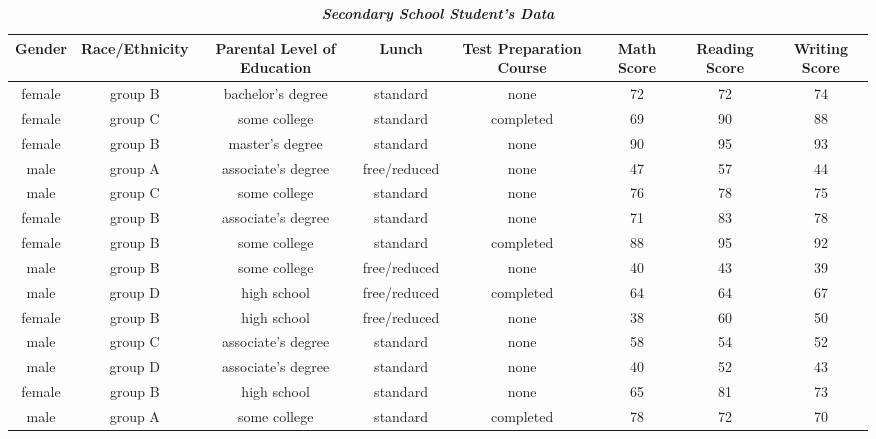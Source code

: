 \documentclass{article}
\begin{document}
 	\begin{table}[h!]
 		\begin{center}
 			\caption{\textbf{\textit{Secondary School Student's Data}}}
 			\label{tab:table1}
 			\begin{small}
 			\begin{tabular}{|c|c|c|c|c|c|c|c|}
 				\hline
 			\textbf{Gender} & \textbf{Race/Ethnicity} & \textbf{Parental Level of Education} & \textbf{Lunch} & \textbf{Test Preparation Course} & \textbf{Math Score} & \textbf{Reading Score} & \textbf{Writing Score}\\
 				\hline
 				female & group B & bachelor's degree & standard & none & 72 & 72 & 74\\
 				\hline
 				female & group C & some college & standard & completed & 69 & 90 & 88\\
 				\hline
 				female & group B & master's degree & standard & none & 90 & 95 & 93\\
 				\hline
 				male & group A & associate's degree & free/reduced & none & 47 & 57 & 44\\
 				\hline
 				male & group C & some college & standard & none & 76 & 78 & 75\\
 				\hline
 				female & group B & associate's degree & standard & none & 71 & 83 & 78\\
 				\hline
 				female & group B & some college & standard & completed & 88 & 95 & 92\\
 				\hline
 				male & group B & some college & free/reduced & none & 40 & 43 & 39\\
 				\hline
 				male & group D & high school & free/reduced & completed & 64 & 64 & 67\\
 				\hline
 				female & group B & high school & free/reduced & none & 38 & 60 & 50\\
 				\hline
 				male & group C & associate's degree & standard & none & 58 & 54 &52\\
 				\hline
 				male & group D & associate's degree & standard & none & 40 & 52 & 43\\
 				\hline
 				female & group B & high school & standard & none & 65 & 81 & 73\\
 				\hline
 				male & group A & some college & standard & completed & 78 & 72 & 70\\
 				\hline
 				
 				\end{tabular}
 			\end{small}
 		\end{center}
 	\end{table}
 
\end{document}
